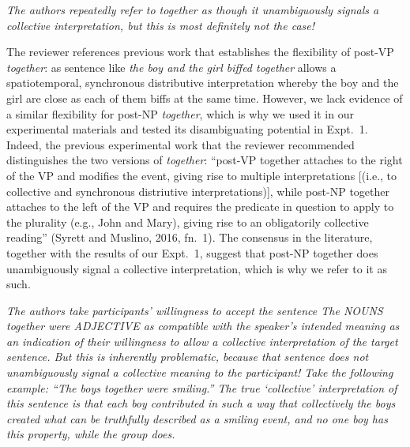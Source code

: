 \documentclass[12pt]{article}
\begin{document}
\item \emph{The authors repeatedly refer to \emph{together} as though it unambiguously signals a collective interpretation, but this is most definitely not the case!}

The reviewer references previous work that establishes the flexibility of post-VP \emph{together}: as sentence like \emph{the boy and the girl biffed together} allows a spatiotemporal, synchronous distributive interpretation whereby the boy and the girl are close as each of them biffs at the same time. However, we lack evidence of a similar flexibility for post-NP \emph{together}, which is why we used it in our experimental materials and tested its disambiguating potential in Expt.~1. Indeed, the previous experimental work that the reviewer recommended distinguishes the two versions of \emph{together}: 
``post-VP together attaches to the right of the VP and modifies the event, giving rise to multiple interpretations [(i.e., to collective and synchronous distriutive interpretations)], while post-NP together attaches to the left of the VP and requires the predicate in question to apply to the plurality (e.g., John and Mary), giving rise to an obligatorily collective reading'' (Syrett and Muslino, 2016, fn.~1). The consensus in the literature, together with the results of our Expt.~1, suggest that post-NP together does unambiguously signal a collective interpretation, which is why we refer to it as such.

\item \emph{The authors take participants' willingness to accept the sentence \emph{The NOUNS together were ADJECTIVE} as compatible with the speaker's intended meaning as an indication of their willingness to allow a collective interpretation of the target sentence. But this is inherently problematic, because that sentence does not unambiguously signal a collective meaning to the participant! Take the following example: ``The boys together were smiling.'' The true `collective' interpretation of this sentence is that each boy contributed in such a way that collectively the boys created what can be truthfully described as a smiling event, and no one boy has this property, while the group does.}
\end{document}
